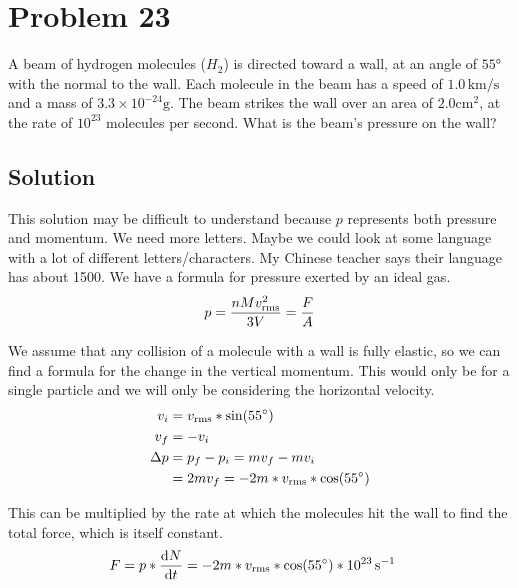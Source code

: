 \documentclass[12pt]{article}
\begin{document}
    \pagebreak
    \section{Problem 23}
        A beam of hydrogen molecules ($H_2$) is directed toward a wall, at an angle of $55\unit{\degree}$ with the normal to the wall. 
        Each molecule in the beam has a speed of $1.0\,\unit{\kilo\meter/\second}$ and a mass of $3.3 \times 10^{-24} \unit{\gram}$. 
        The beam strikes the wall over an area of $2.0 \unit{\centi\meter^2}$, at the rate of $10^{23}$ molecules per second. 
        What is the beam's pressure on the wall?

        \subsection{Solution}
            This solution may be difficult to understand because $p$ represents both pressure and momentum.
            We need more letters.
            Maybe we could look at some language with a lot of different letters/characters.
            My Chinese teacher says their language has about 1500.
            We have a formula for pressure exerted by an ideal gas.
            \begin{equation}
                p   =   \frac{nMv_{\rm rms}^2}{3V}  =   \frac{F}{A}
            \end{equation}

            We assume that any collision of a molecule with a wall is fully elastic, so we can find a formula for the change in the vertical momentum.
            This would only be for a single particle and we will only be considering the horizontal velocity.
            \begin{align}
                v_i &=  v_{\rm rms} * \sin(55\unit{\degree})\\
                v_f &=  -v_i\\
                \Delta p    &=  p_f - p_i
                    =   mv_f - mv_i\\
                    &=  2mv_f
                    =   -2m * v_{\rm rms} * \cos(55\unit{\degree})
            \end{align}

            This can be multiplied by the rate at which the molecules hit the wall to find the total force, which is itself constant.
            \begin{align}
                F   &=  p * \dv{N}{t}
                    =   -2m * v_{\rm rms} * \cos(55\unit{\degree}) * 10^{23}\,\unit{\second^{-1}}
            \end{align}
\end{document}
